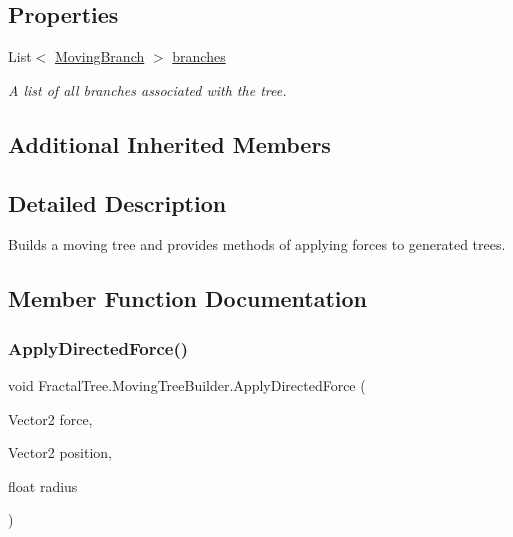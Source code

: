 \subsection*{Properties}
\begin{DoxyCompactItemize}
\item 
List$<$ \hyperlink{interface_fractal_tree_1_1_moving_branch}{Moving\+Branch} $>$ \hyperlink{class_fractal_tree_1_1_moving_tree_builder_aca75f30f0c8170efd0b62eca6eee9e00}{branches}
\begin{DoxyCompactList}\small\item\em A list of all branches associated with the tree. \end{DoxyCompactList}\end{DoxyCompactItemize}
\subsection*{Additional Inherited Members}


\subsection{Detailed Description}
Builds a moving tree and provides methods of applying forces to generated trees. 



\subsection{Member Function Documentation}
\mbox{\label{class_fractal_tree_1_1_moving_tree_builder_a7da9440aa0482b959854bb28ff281a9a}} 
\subsubsection{\texorpdfstring{Apply\+Directed\+Force()}{ApplyDirectedForce()}}
{\footnotesize\ttfamily void Fractal\+Tree.\+Moving\+Tree\+Builder.\+Apply\+Directed\+Force (\begin{DoxyParamCaption}\item[{Vector2}]{force,  }\item[{Vector2}]{position,  }\item[{float}]{radius }\end{DoxyParamCaption})}



